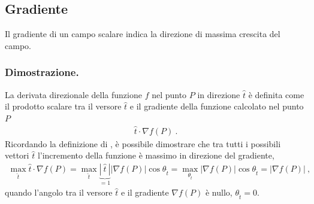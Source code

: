 \documentclass[letterpaper,10pt,italian]{jupyterBook}
\begin{document}
\subsection{Gradiente}
\label{\detokenize{ch/vector-calculus/derivatives:gradiente}}
\sphinxAtStartPar
{} 

\sphinxAtStartPar
{} Il gradiente di un campo scalare indica la direzione  di massima crescita del campo.
\subsubsection*{Dimostrazione.}

\sphinxAtStartPar
La derivata direzionale della funzione \(f\) nel punto \(P\) in direzione \(\hat{t}\) è definita come il prodotto scalare tra il versore \(\hat{t}\) e il gradiente della funzione calcolato nel punto \(P\)
\begin{equation*}
\begin{split}\hat{t} \cdot \nabla f(P) \ .\end{split}
\end{equation*}
\sphinxAtStartPar
Ricordando la definizione di {\hyperref[\detokenize{ch/algebra/vector-algebra-euclidean-space:math-hs-algebra-vector-euclidean-space-inner-product}]{}}, è possibile dimostrare che tra tutti i possibili vettori \(\hat{t}\) l’incremento della funzione è massimo in direzione del gradiente,
\begin{equation*}
\begin{split}\max_{\hat{t}} \hat{t} \cdot \nabla f(P) = \max_{\hat{t}} \underbrace{|\ \hat{t} \ |}_{=1} |\nabla f(P)| \cos \theta_{\hat{t}} = \max_{\theta_{\hat{t}}} |\nabla f(P)| \cos \theta_{\hat{t}} = |\nabla f(P)| \ ,\end{split}
\end{equation*}
\sphinxAtStartPar
quando l’angolo tra il versore \(\hat{t}\) e il gradiente \(\nabla f(P)\) è nullo, \(\theta_{\hat{t}} = 0\).
\end{document}
